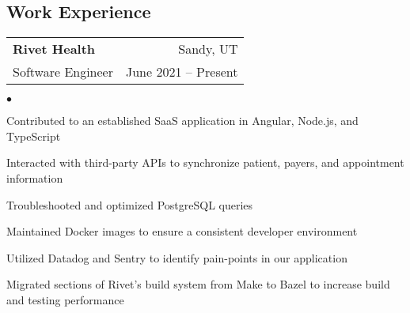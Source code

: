 \documentclass[margin, 11pt]{res}
\makeatletter
\newcommand{\li}{https://linkedin.com/in/jakegut}
\newcommand{\gh}{https://github.com/jakegut}
\newcommand{\personalsite}{https://jakegut.com}
\newcommand{\resumeSubheading}[4]{

\begin{tabular*}{1.01\textwidth}{@{\hspace{-4pt}}l @{\extracolsep{\fill}} r}
\textbf{#1} & #2 \\
      {#3} &  {#4}
\end{tabular*}\vspace{-2pt}
}
\newenvironment{list2}{
	\begin{list}{$\bullet$}{%
	    \small
		\setlength{\itemsep}{0in}
		\setlength{\parsep}{0in} \setlength{\parskip}{0in}
		\setlength{\topsep}{0in} \setlength{\partopsep}{0in}
		\setlength{\leftmargin}{0.2in}}}{\end{list}}
\makeatother
\begin{document}
\address{
    \small 979-676-3030 $|$ 
    \href{mailto:jakegut0108@gmail.com}{jakegut0108@gmail.com} $|$ 
    \href{\li}{linkedin.com/in/jakegut} $|$
    \href{\gh}{github.com/jakegut}
}

\begin{resume}

\section{\sc Work Experience}

\vspace{2pt}
                 
\resumeSubheading{{\bf Rivet Health}}{Sandy, UT}
                 {Software Engineer}{June 2021 -- Present}
                 
\begin{list2}
\item{Contributed to an established SaaS application in Angular, Node.js, and TypeScript}
\item{Interacted with third-party APIs to synchronize patient, payers, and appointment information}
\item{Troubleshooted and optimized PostgreSQL queries}
\item{Maintained Docker images to ensure a consistent developer environment}
\item{Utilized Datadog and Sentry to identify pain-points in our application}
\item{Migrated sections of Rivet's build system from Make to Bazel to increase build and testing performance}
\end{list2}


\end{resume}
\end{document}
